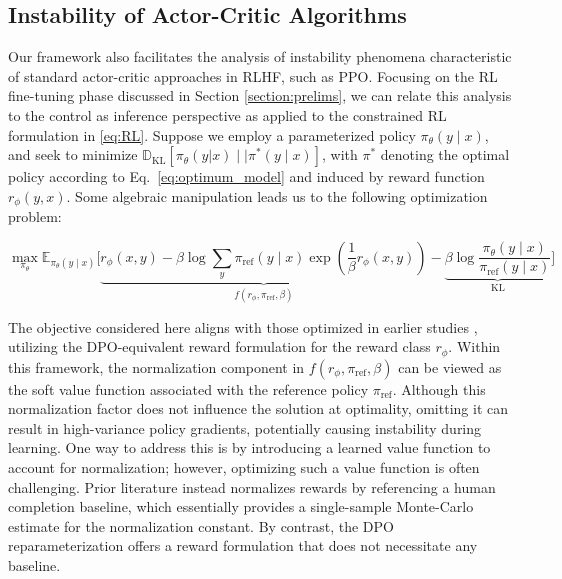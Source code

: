\subsection{Instability of Actor-Critic Algorithms}
Our framework also facilitates the analysis of instability phenomena characteristic of standard actor-critic approaches in RLHF, such as PPO. Focusing on the RL fine-tuning phase discussed in Section \ref{section:prelims}, we can relate this analysis to the control as inference perspective \cite{levine2018reinforcement} as applied to the constrained RL formulation in \ref{eq:RL}. Suppose we employ a parameterized policy $\pi_{\theta}(y\mid x)$, and seek to minimize $\mathbb{D}_{\text{KL}}[\pi_{\theta}(y|x) \mid \mid \pi^*(y\mid x)]$, with $\pi^*$ denoting the optimal policy according to Eq.~\ref{eq:optimum_model} and induced by reward function $r_{\phi}(y, x)$. Some algebraic manipulation leads us to the following optimization problem:

\begin{equation}\label{eq:AC}
    \max_{\pi_{\theta}}\mathbb{E}_{\pi_{\theta}(y\mid x)}\bigg[\underbrace{r_{\phi}(x, y) -\beta\log\sum_{y}\pi_\text{ref}(y\mid x)\exp\left(\frac{1}{\beta}r_{\phi}(x, y)\right)}_{f(r_{\phi}, \pi_\text{ref}, \beta)} - \underbrace{\beta\log\frac{\pi_{\theta}(y\mid x)}{\pi_\text{ref}(y\mid x)}}_{\text{KL}}\bigg]
\end{equation}

The objective considered here aligns with those optimized in earlier studies \citep{ziegler2020finetuning, stiennon2022learning, bai2022training, ouyang2022training}, utilizing the DPO-equivalent reward formulation for the reward class $r_{\phi}$. Within this framework, the normalization component in $f(r_{\phi}, \pi_\text{ref}, \beta)$ can be viewed as the soft value function associated with the reference policy $\pi_\text{ref}$. Although this normalization factor does not influence the solution at optimality, omitting it can result in high-variance policy gradients, potentially causing instability during learning. One way to address this is by introducing a learned value function to account for normalization; however, optimizing such a value function is often challenging. Prior literature instead normalizes rewards by referencing a human completion baseline, which essentially provides a single-sample Monte-Carlo estimate for the normalization constant. By contrast, the DPO reparameterization offers a reward formulation that does not necessitate any baseline.

